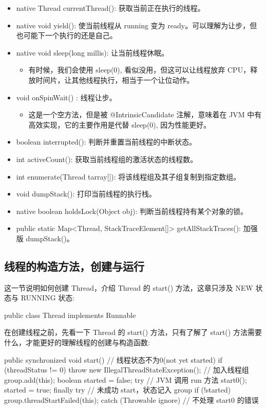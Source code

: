 \begin{itemize}
    \item native Thread currentThread(): 获取当前正在执行的线程。
    \item native void yield(): 使当前线程从 running 变为 ready。可以理解为让步，但也可能下一个执行的还是自己。
    \item native void sleep(long millis): 让当前线程休眠。
    \begin{itemize}
        \item 有时候，我们会使用 sleep(0), 看似没用，但这可以让线程放弃 CPU，释放时间片，让其他线程执行，相当于一个让位动作。
    \end{itemize}
    \item void onSpinWait() {}: 线程让步。
    \begin{itemize}
        \item 这是一个空方法，但是被 @IntrinsicCandidate 注解，意味着在 JVM 中有高效实现，它的主要作用是代替 sleep(0), 因为性能更好。
    \end{itemize}
    \item boolean interrupted(): 判断并重置当前线程的中断状态。
    \item int activeCount(): 获取当前线程组的激活状态的线程数。
    \item int enumerate(Thread tarray[]): 将该线程组及其子组复制到指定数组。
    \item void dumpStack(): 打印当前线程的执行栈。
    \item native boolean holdsLock(Object obj): 判断当前线程持有某个对象的锁。
    \item public static Map<Thread, StackTraceElement[]> getAllStackTraces(): 加强版 dumpStack()。
\end{itemize}

\subsection{线程的构造方法，创建与运行}

这一节说明如何创建 Thread，介绍 Thread 的 start() 方法，这章只涉及 NEW 状态与 RUNNING 状态:

\begin{Java}
public class Thread implements Runnable
\end{Java}

在创建线程之前，先看一下 Thread 的 start() 方法，只有了解了 start() 方法需要什么，才能更好的理解线程的创建与构造函数:

\begin{Java}
public synchronized void start() {
    // 线程状态不为0(not yet started)
    if (threadStatus != 0)
        throw new IllegalThreadStateException();
    // 加入线程组
    group.add(this);
    boolean started = false;
    try {
        // JVM 调用 run 方法
        start0();
        started = true;
    } finally {
        try {
            // 未成功 start，状态记入 group
            if (!started) {
                group.threadStartFailed(this);
            }
        } catch (Throwable ignore) {
            // 不处理 start0 的错误
        }
    }
}
\end{Java}


